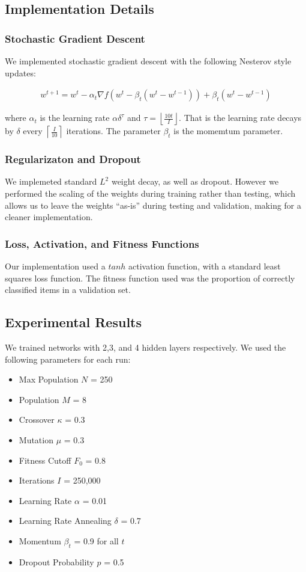 \documentclass{article}
\DeclareMathOperator{\1}{\mathbbm{1}}
\begin{document}
\subsection{Implementation Details}

\subsubsection{Stochastic Gradient Descent}
We implemented stochastic gradient descent with the following Nesterov style updates:

\begin{align*}
w^{t+1} = w^t - \alpha_t \nabla f(w^t - \beta_t(w^t -w^{t-1})) +  \beta_t(w^t -w^{t-1})
\end{align*}

where $\alpha_t$ is the learning rate $\alpha  \delta^{\tau}$ and $\tau = \left \lfloor{ \frac {10t} I}\right \rfloor$. 
That is the learning rate decays by $\delta$ every $\left \lceil{ \frac I {10}}\right \rceil$ iterations. The parameter
$\beta_t$ is the momemtum parameter. 

\subsubsection{Regularizaton and Dropout}
We implemeted standard $L^2$ weight decay, as well as dropout. However we performed the scaling of the weights during training
rather than testing, which allows us to leave the weights ``as-is'' during testing and validation, making for a cleaner implementation.

\subsubsection{Loss, Activation, and Fitness Functions}
Our implementation used a $tanh$ activation function, with a standard least squares loss function. The fitness function
used was the proportion of correctly classified items in a validation set.

\subsection{Experimental Results}
We trained networks with 2,3, and 4 hidden layers respectively. We used the following parameters for each run:

\begin{itemize}
  \item Max Population $N$ = 250
  \item Population $M$ = 8
  \item Crossover $\kappa$ = 0.3
  \item Mutation $\mu$ = 0.3
  \item Fitness Cutoff $F_0$ = 0.8
  \item Iterations $I$ = 250,000
  \item Learning Rate $\alpha$ = 0.01
  \item Learning Rate Annealing $\delta$ = 0.7
  \item Momentum $\beta_t$ = 0.9 for all $t$
  \item Dropout Probability $p$ = 0.5
\end{itemize}
\end{document}
